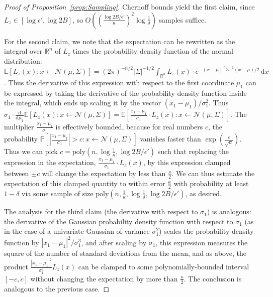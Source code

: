 \documentclass[11pt,letter]{article}
\renewcommand{\Pr}{\mathbb{P}}
\newcommand{\Exp}{\mathbb{E}}
\renewcommand{\poly}{\mathrm{poly}}
\renewcommand{\d}{\mathrm{d}}
\newcommand{\Diff}[2][]{\frac{\d#1}{\d#2}}
\numberwithin{nTheorems}{section}
\begin{document}
\begin{proof}[Proof of Proposition~\ref{prop:Sampling}]

Chernoff bounds yield the first claim, since $L_z\in [\log\epsilon',\log 2B]$, so $O((\frac{\log 2B/\epsilon'}{\kappa})^2\log \frac{1}{\delta})$ samples suffice.

For the second claim, we note that the expectation can be rewritten as the integral over $\mathbb{R}^n$ of $L_z$ times the probability density function of the normal distribution: $\Exp[L_z(x):x\leftarrow \mathcal{N}(\mu,\Sigma)]=(2\pi)^{-n/2}|\Sigma|^{-1/2}\int_{\mathbb{R}^n} L_z(x)\cdot e^{-(x-\mu)^T\Sigma^{-1}(x-\mu)/2}\,\d x$. Thus the derivative of this expression with respect to the first coordinate $\mu_1$ can be expressed by taking the derivative of the probability density function inside the integral, which ends up scaling it by the vector $(x_1-\mu_1)/\sigma_1^2$. Thus $\sigma_1\cdot\Diff{\mu_1} \Exp[L_z(x):x\leftarrow \mathcal{N}(\mu,\Sigma)]=\Exp[\frac{x_1-\mu_1}{\sigma_1}\cdot L_z(x):x\leftarrow \mathcal{N}(\mu,\Sigma)]$. The multiplier $\frac{x_1-\mu_1}{\sigma_1}$ is effectively bounded, because for real numbers $c$, the probability $\Pr[\left|\frac{x_1-\mu_1}{\sigma_1}\right|>c:x\leftarrow\mathcal{N}(\mu,\Sigma)]$ vanishes faster than $\exp(\frac{c}{\sqrt{n}})$. Thus we can pick $c=\poly(n,\log \frac{1}{\kappa},\log 2B/\epsilon')$ such that replacing the expression in the expectation, $\frac{x_1-\mu_1}{\sigma_1}\cdot L_z(x)$, by this expression clamped between $\pm c$ will change the expectation by less than $\frac{\kappa}{2}$. We can thus estimate the expectation of this clamped quantity to within error $\frac{\kappa}{2}$ with probability at least $1-\delta$ via some sample of size $\poly(n,\frac{1}{\kappa},\log\frac{1}{\delta},\log 2B/\epsilon')$, as desired.

The analysis for the third claim (the derivative with respect to $\sigma_1$) is analogous: the derivative of the Gaussian probability density function with respect to $\sigma_1$ (as in the case of a univariate Gaussian of variance $\sigma_1^2$) scales the probability density function by $|x_1-\mu_1|^2/\sigma_1^3$, and after scaling by $\sigma_1$, this expression measures the square of the number of standard deviations from the mean, and as above, the product $\frac{|x_1-\mu_1|^2}{\sigma_1^2} L_z(x)$ can be clamped to some polynomially-bounded interval $[-c,c]$ without changing the expectation by more than $\frac{\kappa}{2}$. The conclusion is analogous to the previous case.
\end{proof}
\end{document}
